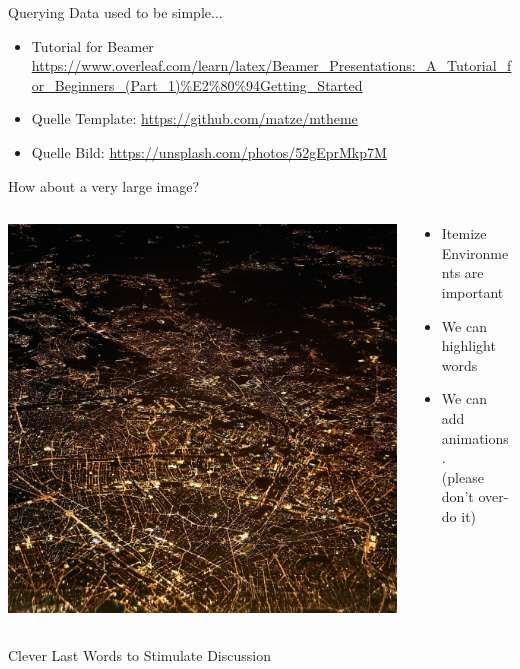 \documentclass[aspectratio=169,10pt]{beamer}
\begin{document}
\begin{frame}[t,fragile]{Querying Data used to be simple...}
\begin{itemize}
	\item Tutorial for Beamer \url{https://www.overleaf.com/learn/latex/Beamer_Presentations:_A_Tutorial_for_Beginners_(Part_1)%E2%80%94Getting_Started}
		\item Quelle Template: \url{https://github.com/matze/mtheme}
		\item Quelle Bild: \url{https://unsplash.com/photos/52gEprMkp7M}
	\end{itemize}
\end{frame}

\begin{frame}[fragile]{How about a very large image?}

\begin{columns}
	\begin{column}{0.57\paperwidth}
		\vspace{0.5pt}
		\includegraphics[width=\linewidth, clip]{images/city}
	\end{column}
	\begin{column}[c]{0.43\paperwidth}
		\begin{itemize}
			\item Itemize Environments are important
			\item We can \alert{highlight} words
			\pause
			\item We can add animations.\\(please don't over-do it)
		\end{itemize}
	\end{column}
\end{columns}
\end{frame}

\begin{frame}[t,standout]
\Large
Clever Last Words to Stimulate Discussion
\end{frame}
\end{document}
